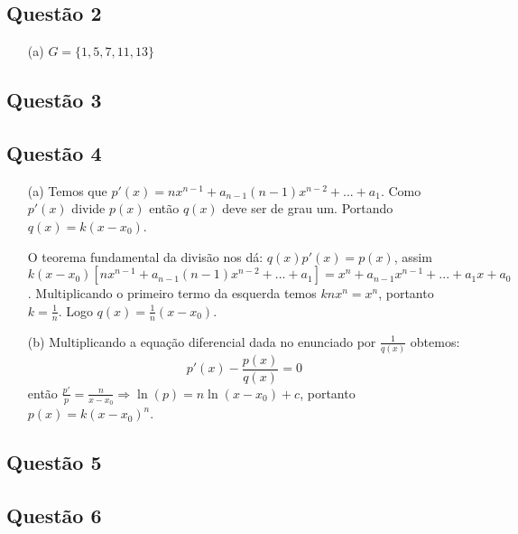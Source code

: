\documentclass{report}
\begin{document}
\subsection{\color{red} Quest\~ao 2}

\begin{enumerate}

\item[(a)] $G=\{ 1,5,7,11,13 \}$

\end{enumerate}

\subsection{\color{red} Quest\~ao 3}



\subsection{\color{red} Quest\~ao 4}

\begin{enumerate}

\item[(a)] Temos que $p'(x)=nx^{n-1}+a_{n-1}(n-1)x^{n-2}+...+a_1$. Como $p'(x)$ divide $p(x)$ ent\~ao $q(x)$ deve ser de grau um. Portando $q(x)=k(x-x_0)$.

O teorema fundamental da divis\~ao nos d\'a: $q(x)p'(x)=p(x)$, assim $k(x-x_0)[nx^{n-1}+a_{n-1}(n-1)x^{n-2}+...+a_1]=x^n + a_{n-1} x^{n-1} + ... + a_1 x + a_0$. Multiplicando o primeiro termo da esquerda temos $knx^n=x^n$, portanto $k=\frac1{n}$. Logo $q(x)= \frac1{n}(x-x_0)$.

\item[(b)] Multiplicando a equa\c c\~ao diferencial dada no enunciado por $\frac1{q(x)}$ obtemos: $$p'(x)-\frac{p(x)}{q(x)}=0$$ ent\~ao $\frac{p'}{p}=\frac{n}{x-x_0} \Longrightarrow \ln(p)=n\ln(x-x_0)+c$, portanto $p(x)=k(x-x_0)^n$.

\end{enumerate}

\subsection{\color{red} Quest\~ao 5}



\subsection{\color{red} Quest\~ao 6}
\end{document}
